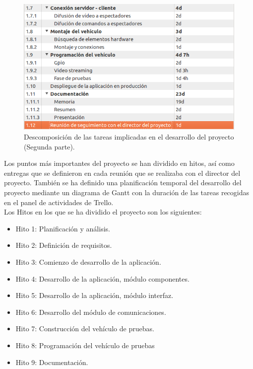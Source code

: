 \documentclass[a4paper,12pt]{article}
\begin{document}
\begin{figure}
  \begin{center}
    \includegraphics[scale=0.6]{imagenes/descomposicion_tareas02.png}
  \end{center}
  \caption{Descomposición de las tareas implicadas en el desarrollo del proyecto (Segunda parte).}
  \label{gantt:tareas02}
\end{figure}

Los puntos más importantes del proyecto se han dividido en hitos, así como entregas que se definieron en cada reunión que se realizaba con el director del proyecto. 
También se ha definido una planificación temporal del desarrollo del proyecto mediante un diagrama de Gantt con la duración de las tareas recogidas en el panel de actividades de Trello.\\

Los Hitos en los que se ha dividido el proyecto son los siguientes:

\begin{itemize}
 \item Hito 1: Planificación y análisis.
 \item Hito 2: Definición de requisitos.
 \item Hito 3: Comienzo de desarrollo de la aplicación.
 \item Hito 4: Desarrollo de la aplicación, módulo componentes.
 \item Hito 5: Desarrollo de la aplicación, módulo interfaz.
 \item Hito 6: Desarrollo del módulo de comunicaciones.
 \item Hito 7: Construcción del vehículo de pruebas.
 \item Hito 8: Programación del vehículo de pruebas
 \item Hito 9: Documentación.
\end{itemize}
\end{document}
